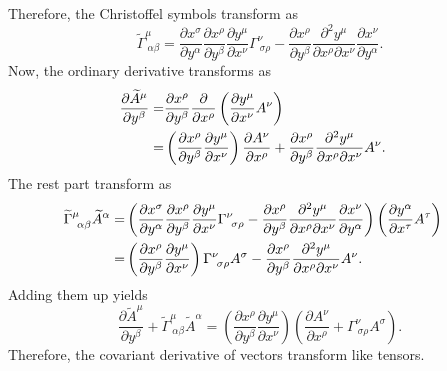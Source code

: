 \documentclass{article}
\begin{document}
Therefore, the Christoffel symbols transform as
\begin{equation}
\widetilde{\Gamma}^\mu_{~\alpha\beta} = \frac{\partial x^\sigma}{\partial y^\alpha}\frac{\partial x^\rho}{\partial y^\beta} \frac{\partial y^\mu}{\partial x^\nu}\Gamma^\nu_{~\sigma \rho}
-\frac{\partial x^\rho}{\partial y^\beta}\frac{\partial^2 y^\mu}{\partial x^\rho\partial x^\nu}\frac{\partial x^\nu}{\partial y^\alpha}.
\end{equation}
Now, the ordinary derivative transforms as 
\begin{align}
\frac{\partial \widetilde{A}^\mu}{\partial y^\beta} =& \frac{\partial x^\rho}{\partial y^\beta}\frac{\partial}{\partial x^\rho}\left(\frac{\partial y^\mu}{\partial x^\nu} A^\nu\right)\cr
=&\left(\frac{\partial x^\rho}{\partial y^\beta}\frac{\partial y^\mu}{\partial x^\nu}\right)\frac{\partial A^\nu}{\partial x^\rho}
+\frac{\partial x^\rho}{\partial y^\beta}\frac{\partial^2 y^\mu}{\partial x^\rho \partial x^\nu} A^\nu.
\end{align}
The rest part transform as
\begin{align}
\widetilde{\Gamma}^\mu_{~\alpha\beta} \widetilde{A}^\alpha
=&\left(\frac{\partial x^\sigma}{\partial y^\alpha}\frac{\partial x^\rho}{\partial y^\beta} \frac{\partial y^\mu}{\partial x^\nu}\Gamma^\nu_{~\sigma \rho}
-\frac{\partial x^\rho}{\partial y^\beta}\frac{\partial^2 y^\mu}{\partial x^\rho\partial x^\nu}\frac{\partial x^\nu}{\partial y^\alpha}\right)
\left(\frac{\partial y^\alpha}{\partial x^\tau} A^\tau\right)\cr
=&\left(\frac{\partial x^\rho}{\partial y^\beta}\frac{\partial y^\mu}{\partial x^\nu}\right)\Gamma^\nu_{~ \sigma \rho}A^\sigma
-\frac{\partial x^\rho}{\partial y^\beta}\frac{\partial^2 y^\mu}{\partial x^\rho\partial x^\nu}A^\nu.
\end{align}
Adding them up yields
\begin{equation}
\frac{\partial \widetilde{A}^\mu}{\partial y^\beta} 
+\widetilde{\Gamma}^\mu_{~\alpha\beta} \widetilde{A}^\alpha 
=\left(\frac{\partial x^\rho}{\partial y^\beta}\frac{\partial y^\mu}{\partial x^\nu}\right)\left(\frac{\partial A^\nu}{\partial x^\rho}
+\Gamma^\nu_{~ \sigma \rho}A^\sigma\right).
\end{equation}
Therefore, the covariant derivative of vectors transform like tensors.
\end{document}
